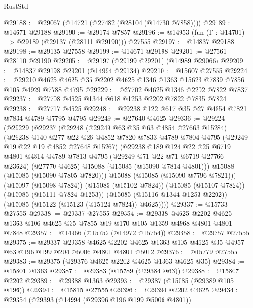 \begin{lexlean}{RustStd}
\begin{coremodule}
@29188 := @29067 (@14721 (@27482 (@28104 (@14730 @7858))))
@29189 := @14671 @29188
@29190 := @29174 @7857
@29196 := @14953 (fun (Γ : @14701) => @29189 (@29137 (@28111 @29190))) @27555
@29197 := @14837 @29188
@29198 := @29135 @27558
@29199 := @14671 @29198
@29201 := @27561 @28110 @29190
@29205 := @29197 (@29199 @29201) (@14989 @29066)
@29209 := @14837 @29198 @29201 (@14994 @29134)
@29210 := @15607 @27555
@29224 := @29210 @4625 @4625 @35 @2202 @4625 @1346 @1363 @15623 @7839 @7856 @105 @4929 @7788 @4795
@29229 := @27702 @4625 @1346 @2202 @7822 @7837
@29237 := @27708 @4625 @1344 @618 @1253 @2202 @7822 @7835 @7824
@29238 := @27717 @4625
@29248 := @29238 @122 @617 @35 @27 @4854 @7821 @7834 @4789 @7795 @4795
@29249 := @27640 @4625
@29336 := @29224
    (@29229
      (@29237
        (@29248
          (@29249 @63 @35 @63 @4854 @27663 @15284)
          (@29238
            @140
            @277
            @22
            @26
            @4852
            @7820
            @7833
            @4789
            @7804
            @4795
            (@29249 @19 @22 @19 @4852 @27648 @15267)
            (@29238
              @189
              @124
              @22
              @25
              @6719
              @4801
              @4814
              @4789
              @7813
              @4795
              (@29249 @71 @22 @71 @6719 @27766 @23624)
              (@27770 @4625)
              @15088
              (@15085 (@15090 @7814 @4801)))
            @15088
            (@15085 (@15090 @7805 @7820)))
          @15088
          (@15085 (@15090 @7796 @7821)))
        (@15097 (@15098 @7824))
        (@15085 (@15102 @7824))
        (@15085 (@15107 @7824))
        (@15085 (@15111 @7824 @1253))
        (@15085 (@15116 @1344 @1253 @2202))
        (@15085 (@15122 (@15123 (@15124 @7824)) @4625))))
@29337 := @15733 @27555
@29338 := @29337 @27555
@29354 := @29338
    @4625
    @2202
    @4625
    @1363
    @106
    @4625
    @35
    @7855
    @19
    @170
    @105
    @1359
    @4968
    @4801
    @4801
    @7848
@29357 := @14966 (@15752 (@14972 @15754))
@29358 := @29357 @27555
@29375 := @29337
    @29358
    @4625
    @2202
    @4625
    @1363
    @105
    @4625
    @35
    @4957
    @63
    @196
    @199
    @204
    @5006
    @4801
    @4801
    @5012
@29376 := @15779 @27555
@29383 := @29375 (@29376 @4625 @2202 @4625 @1363 @4625 @35)
@29384 := @15801 @1363
@29387 := @29383 (@15789 (@29384 @63))
@29388 := @15807 @2202
@29389 := @29388 @1363
@29393 := @29387 (@15085 (@29389 @105 @196))
@29394 := @15815 @27555
@29396 := @29394 @2202 @4625
@29434 := @29354
    (@29393
      (@14994 (@29396 @196 @199 @5006 @4801))

\end{coremodule}
\end{lexlean}
